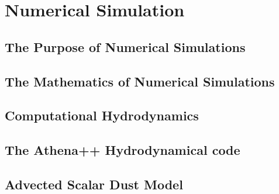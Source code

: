 \chapter{Numerical Simulation}
\label{ch:numsim}

\section{The Purpose of Numerical Simulations}
\label{sec:numerical-purpose}

\section{The Mathematics of Numerical Simulations}
\label{sec:numerical-math}

\section{Computational Hydrodynamics}

\label{sec:hydrodynamics}

\section{The Athena++ Hydrodynamical code}
\label{sec:athenapp}

\section{Advected Scalar Dust Model}
\label{sec:advectedscalardust}